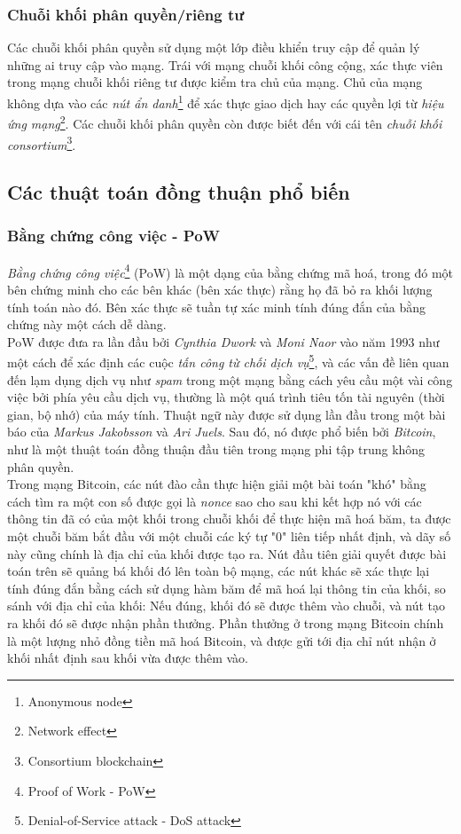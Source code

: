 \subsubsection{Chuỗi khối phân quyền/riêng tư}
Các chuỗi khối phân quyền sử dụng một lớp điều khiển truy cập để quản lý những ai truy cập vào mạng. Trái với mạng chuỗi khối công cộng, xác thực viên trong mạng chuỗi khối riêng tư được kiểm tra chủ của mạng. Chủ của mạng không dựa vào các \textit{nút ẩn danh}\footnote{Anonymous node} để xác thực giao dịch hay các quyền lợi từ \textit{hiệu ứng mạng}\footnote{Network effect}. Các chuỗi khối phân quyền còn được biết đến với cái tên \textit{chuỗi khối consortium}\footnote{Consortium blockchain}.

\subsection{Các thuật toán đồng thuận phổ biến}

\subsubsection{Bằng chứng công việc - PoW}

\textit{Bằng chứng công việc}\footnote{Proof of Work - PoW} (PoW) là một dạng của bằng chứng mã hoá, trong đó một bên chứng minh cho các bên khác (bên xác thực) rằng họ đã bỏ ra khối lượng tính toán nào đó. Bên xác thực sẽ tuần tự xác minh tính đúng đắn của bằng chứng này một cách dễ dàng.\\

PoW được đưa ra lần đầu bởi \textit{Cynthia Dwork} và \textit{Moni Naor} vào năm 1993 như một cách để xác định các cuộc \textit{tấn công từ chối dịch vụ}\footnote{Denial-of-Service attack - DoS attack}, và các vấn đề liên quan đến lạm dụng dịch vụ như \textit{spam} trong một mạng bằng cách yêu cầu một vài công việc bởi phía yêu cầu dịch vụ, thường là một quá trình tiêu tốn tài nguyên (thời gian, bộ nhớ) của máy tính. Thuật ngữ này được sử dụng lần đầu trong một bài báo của \textit{Markus Jakobsson} và \textit{Ari Juels}. Sau đó, nó được phổ biến bởi \textit{Bitcoin}, như là một thuật toán đồng thuận đầu tiên trong mạng phi tập trung không phân quyền.\\

Trong mạng Bitcoin, các nút đào cần thực hiện giải một bài toán "khó" bằng cách tìm ra một con số được gọi là \textit{nonce} sao cho sau khi kết hợp nó với các thông tin đã có của một khối trong chuỗi khối để thực hiện mã hoá băm, ta được một chuỗi băm bắt đầu với một chuỗi các ký tự "0" liên tiếp nhất định, và dãy số này cũng chính là địa chỉ của khối được tạo ra. Nút đầu tiên giải quyết được bài toán trên sẽ quảng bá khối đó lên toàn bộ mạng, các nút khác sẽ xác thực lại tính đúng đắn bằng cách sử dụng hàm băm để mã hoá lại thông tin của khối, so sánh với địa chỉ của khối: Nếu đúng, khối đó sẽ được thêm vào chuỗi, và nút tạo ra khối đó sẽ được nhận phần thưởng. Phần thưởng ở trong mạng Bitcoin chính là một lượng nhỏ đồng tiền mã hoá Bitcoin, và được gửi tới địa chỉ nút nhận ở khối nhất định sau khối vừa được thêm vào.\\

